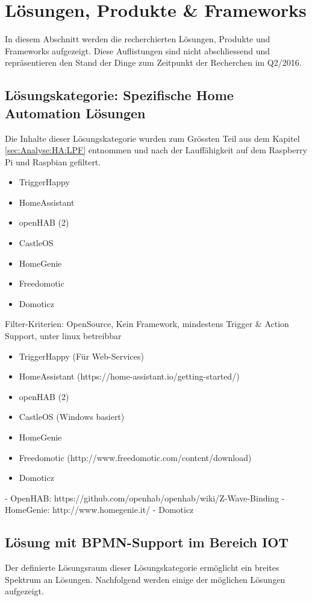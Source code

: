 \section{Lösungen, Produkte \& Frameworks }
In diesem Abschnitt werden die recherchierten Lösungen, Produkte und Frameworks aufgezeigt. Diese Auflistungen sind nicht abschliessend und repräsentieren den Stand der Dinge zum Zeitpunkt der Recherchen im Q2/2016.

\subsection{Lösungskategorie: Spezifische Home Automation Lösungen}
Die Inhalte dieser Lösungskategorie wurden zum Grössten Teil aus dem Kapitel \ref{sec:Analyse:HA:LPF}  entnommen und nach der Lauffähigkeit auf dem Raspberry Pi und Raspbian gefiltert.

\begin{itemize}
\item TriggerHappy
\item HomeAssistant
\item openHAB (2)
\item CastleOS
\item HomeGenie
\item Freedomotic
\item Domoticz
\end{itemize}

Filter-Kriterien: OpenSource, Kein Framework, mindestens Trigger \& Action Support, unter linux betreibbar
\begin{itemize}
\item TriggerHappy (Für Web-Services)
\item HomeAssistant (https://home-assistant.io/getting-started/)
\item openHAB (2)
\item CastleOS (Windows basiert)
\item HomeGenie
\item Freedomotic (http://www.freedomotic.com/content/download)
\item Domoticz
\end{itemize}

- OpenHAB: https://github.com/openhab/openhab/wiki/Z-Wave-Binding
- HomeGenie: http://www.homegenie.it/
- Domoticz

\subsection{Lösung mit BPMN-Support im Bereich IOT}
Der definierte Lösungsraum dieser Lösungskategorie ermöglicht ein breites Spektrum an Lösungen. Nachfolgend werden einige der möglichen Lösungen aufgezeigt.

